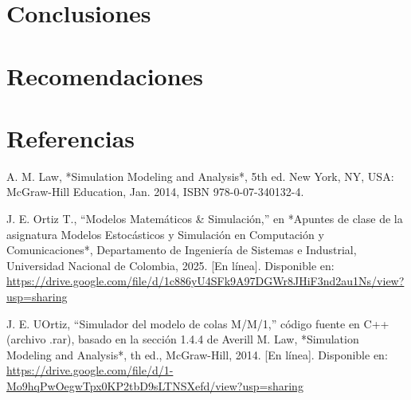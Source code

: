 \documentclass{article}
\begin{document}
\section{Conclusiones}\label{sec:concl}



\section{Recomendaciones}\label{secrecomen}

\section{Referencias}
\renewcommand{\refname}{}
\begin{thebibliography}{9}

 \label{ref:modSim} A. M. Law, *Simulation Modeling and Analysis*, 5th ed. 
New York, NY, USA: McGraw-Hill Education, Jan. 2014, ISBN 978-0-07-340132-4. 

 \label{ref:matSim} J. E. Ortiz T., “Modelos Matemáticos \& Simulación,”
 en *Apuntes de clase de la asignatura Modelos Estocásticos y Simulación en 
 Computación y Comunicaciones*, Departamento de Ingeniería de Sistemas e Industrial, 
 Universidad Nacional de Colombia, 2025. [En línea]. Disponible en: 
 \url{https://drive.google.com/file/d/1c886yU4SFk9A97DGWr8JHiF3nd2au1Ns/view?usp=sharing}

  \label{ref:cimColas} J. E. UOrtiz, “Simulador del modelo de colas M/M/1,” 
 código fuente en C++ (archivo .rar), basado en la sección 
 1.4.4 de Averill M. Law, *Simulation Modeling and Analysis*, 
 th ed., McGraw-Hill, 2014. [En línea]. Disponible en: 
 \url{https://drive.google.com/file/d/1-Mo9hqPwOegwTpx0KP2tbD9sLTNSXefd/view?usp=sharing}



\end{thebibliography}
\end{document}
